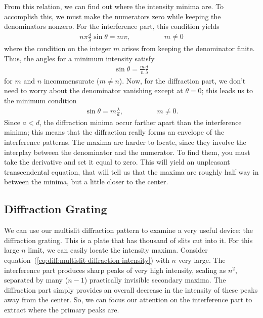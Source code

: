 From this relation, we can find out where the intensity minima are. To 
accomplish this, we must make the numerators zero while keeping the 
denominators nonzero. For the interference part, this condition yields
\begin{eqnarray*}
n \pi \frac{d}{\lambda} \sin \theta = m \pi, \hspace{2cm} m \neq 0
\end{eqnarray*}
where the condition on the integer $m$ arises from keeping the denominator
finite. Thus, the angles for a minimum intensity satisfy
\begin{eqnarray*}
\sin \theta = \frac{m}{n} \frac{d}{\lambda}
\end{eqnarray*}
for $m$ and $n$ incommensurate ($m\neq n$). Now, for the diffraction part, we 
don't need to worry about the denominator vanishing except at $\theta=0$; this 
leads us to the minimum condition
\begin{eqnarray*}
\sin \theta = m \frac{\lambda}{a}, \hspace{2cm} m \neq 0.
\end{eqnarray*}
Since $a < d$, the diffraction minima occur farther apart than the 
interference minima; this means that the diffraction really forms an envelope
of the interference patterns. The maxima are harder to locate, since they 
involve the interplay between the denominator and the numerator. To find them,
you must take the derivative and set it equal to zero. This will yield an
unpleasant transcendental equation, that will tell us that the maxima are 
roughly half way in between the minima, but a little closer to the center.

\subsection{Diffraction Grating}

We can use our multislit diffraction pattern to examine a very useful device:
the diffraction grating. This is a plate that has thousand of slits cut into 
it. For this large $n$ limit, we can easily locate the intensity maxima. 
Consider equation~(\ref{eq:diff:multislit diffraction intensity}) with $n$ very
large. The interference part produces sharp peaks of very high intensity, 
scaling as $n^2$, separated by many ($n-1$) practically invisible secondary
maxima. The diffraction part simply provides an overall decrease in the
intensity of these peaks away from the center. So, we can focus our attention
on the interference part to extract where the primary peaks are.

